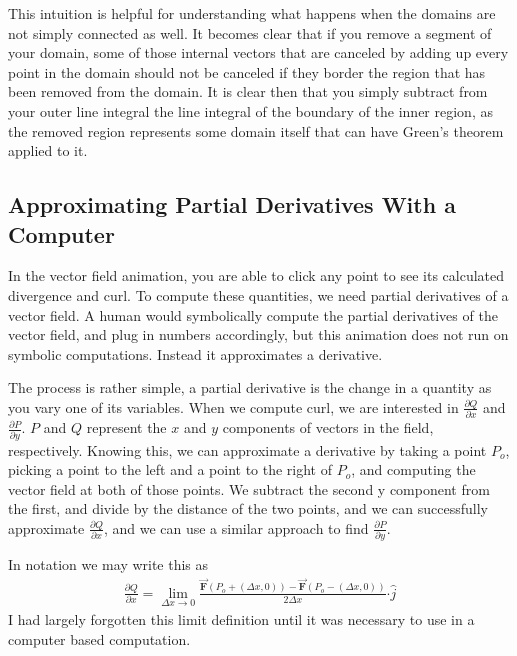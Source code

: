 \documentclass{article}
\begin{document}
    This intuition is helpful for understanding what happens when the domains are not simply connected as well.
    It becomes clear that if you remove a segment of your domain, some of those internal vectors that are canceled by adding up every point in the domain should not be canceled if they border the region that has been removed from the domain.
    It is clear then that you simply subtract from your outer line integral the line integral of the boundary of the inner region, as the removed region represents some domain itself that can have Green's theorem applied to it.

    \subsection*{Approximating Partial Derivatives With a Computer}
    In the vector field animation, you are able to click any point to see its calculated divergence and curl.
    To compute these quantities, we need partial derivatives of a vector field.
    A human would symbolically compute the partial derivatives of the vector field, and plug in numbers accordingly, but this animation does not run on symbolic computations.
    Instead it approximates a derivative.

    The process is rather simple, a partial derivative is the change in a quantity as you vary one of its variables.
    When we compute curl, we are interested in $\frac{\partial Q}{\partial x}$ and $\frac{\partial P}{\partial y}$.
    $P$ and $Q$ represent the $x$ and $y$ components of vectors in the field, respectively.
    Knowing this, we can approximate a derivative by taking a point $P_o$, picking a point to the left and a point to the right of $P_o$, and computing the vector field at both of those points.
    We subtract the second y component from the first, and divide by the distance of the two points, and we can successfully approximate $\frac{\partial Q}{\partial x}$, and we can use a similar approach to find $\frac{\partial P}{\partial y}$.

    In notation we may write this as
    \begin{gather*}
        \frac{\partial Q}{\partial x} = \lim_{\Delta x \to 0} \frac{\vec{\mathbf{F}}(P_o + (\Delta x, 0)) - \vec{\mathbf{F}} (P_o - (\Delta x, 0))}{2\Delta x} \boldsymbol{\cdot} \hat{j}
    \end{gather*}
    I had largely forgotten this limit definition until it was necessary to use in a computer based computation.
\end{document}
